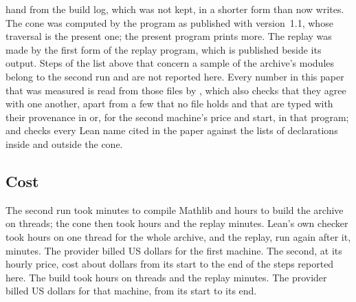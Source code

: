 hand from the build log, which was not kept, in a shorter form than  now
writes. The cone was computed by the program as published with version~1.1, whose traversal
is the present one; the present program prints more. The replay was made by the first form
of the replay program, which is published beside its output. Steps of the list above that
concern a sample of the archive's modules belong to the second run and are not reported
here.
\fi
Every number in
this paper that was measured is read from those files by , which
also checks that they agree with one another, apart from a few that no file holds and that
are typed with their provenance in  or, for the second machine's price
and start, in that program; and 
checks every Lean name cited in the paper against the lists of declarations inside and
outside the cone.

\subsection*{Cost}
\ifsecondrun
The second run took \mathlibminutes{} minutes to compile Mathlib and \buildhours{} hours to
build the archive on \buildthreads{} threads; the cone then took \cuthours{} hours and the
replay \replayminutes{} minutes. Lean's own checker took \freshmainhours{} hours on one
thread for the whole archive, and the replay, run again after it,
\freshmainreplayminutes{} minutes. The provider billed \firstruncost{} US
dollars for the first
machine. The second, at its hourly price, cost about \secondruncost{} dollars from its start
to the end of the steps reported here.
\else
The build took \buildhours{} hours on \buildthreads{} threads and the replay \replayminutes{}
minutes. The provider billed \firstruncost{} US dollars for that machine, from its start to
its end.
\fi
